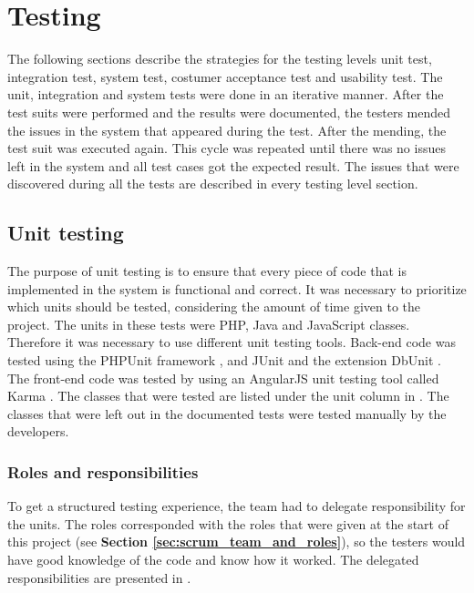 \chapter{Testing}
\label{chap:testing}

The following sections describe the strategies for the testing levels unit test, integration test, system test, costumer acceptance test and usability test. 
The unit, integration and system tests were done in an iterative manner. After the test suits were performed and the results were documented, the testers mended the issues in the system that appeared during the test. After the mending, the test suit was executed again. This cycle was repeated until there was no issues left in the system and all test cases got the expected result. The issues that were discovered during all the tests are described in every testing level section. 


\section{Unit testing}
\label{sec:unit_testing}
The purpose of unit testing is to ensure that every piece of code that is implemented in the system is functional and correct. It was necessary to prioritize which units should be tested, considering the amount of time given to the project. 
The units in these tests were PHP, Java and JavaScript classes. Therefore it was necessary to use different unit testing tools. Back-end code was tested using the PHPUnit framework \cite{KF2}, and JUnit \cite{jUnit} and the extension DbUnit \cite{dbUnit}. The front-end code was tested by using an AngularJS unit testing tool called Karma \cite{KF3}. 
The classes that were tested are listed under the unit column in \textbf{}. The classes that were left out in the documented tests were tested manually by the developers.

\subsection{Roles and responsibilities}
To get a structured testing experience, the team had to delegate responsibility for the units. The roles corresponded with the roles that were given at the start of this project (see \textbf{Section \ref{sec:scrum_team_and_roles}}), so the testers would have good knowledge of the code and know how it worked. The delegated responsibilities are presented in \textbf{}.



